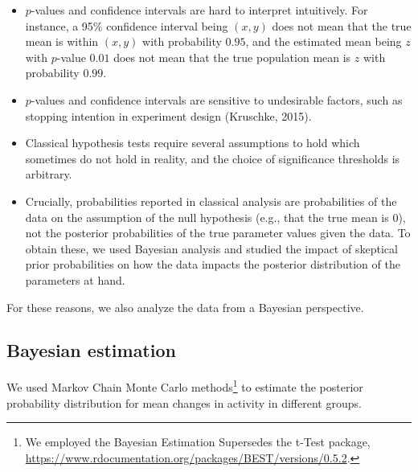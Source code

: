 \documentclass[
  10pt,
  dvipsnames]{scrartcl}
\begin{document}
\begin{itemize}
\item
  \(p\)-values and confidence intervals are hard to interpret
  intuitively. For instance, a 95\% confidence interval being \((x,y)\)
  does not mean that the true mean is within \((x,y)\) with probability
  \(0.95\), and the estimated mean being \(z\) with \(p\)-value \(0.01\)
  does not mean that the true population mean is \(z\) with probability
  \(0.99\).
\item
  \(p\)-values and confidence intervals are sensitive to undesirable
  factors, such as stopping intention in experiment design (Kruschke,
  2015).
\item
  Classical hypothesis tests require several assumptions to hold which
  sometimes do not hold in reality, and the choice of significance
  thresholds is arbitrary.
\item
  Crucially, probabilities reported in classical analysis are
  probabilities of the data on the assumption of the null hypothesis
  (e.g., that the true mean is 0), not the posterior probabilities of
  the true parameter values given the data. To obtain these, we used
  Bayesian analysis and studied the impact of skeptical prior
  probabilities on how the data impacts the posterior distribution of
  the parameters at hand.
\end{itemize}

For these reasons, we also analyze the data from a Bayesian perspective.

\subsection{Bayesian estimation}

We used Markov Chain Monte Carlo methods\footnote{We employed the
  \textsf{Bayesian Estimation Supersedes the t-Test} package,
  \url{https://www.rdocumentation.org/packages/BEST/versions/0.5.2}.} to
estimate the posterior probability distribution for mean changes in
activity in different groups.
\end{document}
